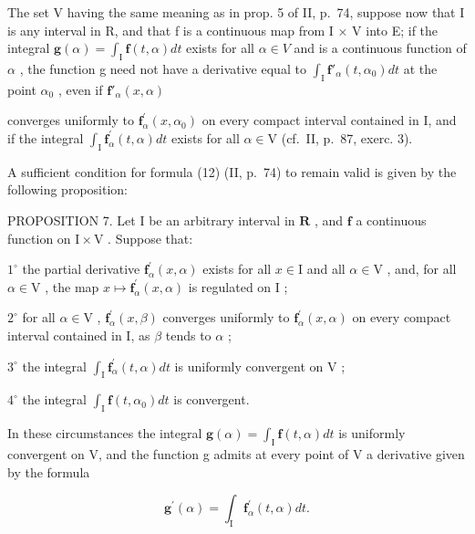 The set V having the same meaning as in prop. 5 of II, p.~74, suppose now that I is any interval in R, and that f is a continuous map from I × V into E; if the integral \(\mathbf{g}(\alpha) = \int_{\mathrm{I}} \mathbf{f}(t, \alpha) dt\) exists for all \(\alpha \in V\) and is a continuous function of \(\alpha\) , the function g need not have a derivative equal to \(\int_{\mathrm{I}} \mathbf{f}'_{\alpha}(t, \alpha_0) dt\) at the point \(\alpha_0\) , even if \(\mathbf{f}'_{\alpha}(x, \alpha)\)

converges uniformly to \(\mathbf{f}_{\alpha}^{\prime}(x,\alpha_{0})\) on every compact interval contained in I, and if the integral \(\int_{\mathrm{I}}\mathbf{f}_{\alpha}^{\prime}(t,\alpha)dt\) exists for all \(\alpha \in \mathrm{V}\) (cf.~II, p.~87, exerc. 3).

A sufficient condition for formula (12) (II, p.~74) to remain valid is given by the following proposition:

PROPOSITION 7. Let I be an arbitrary interval in \(\mathbf{R}\) , and \(\mathbf{f}\) a continuous function on \(\mathrm{I} \times \mathrm{V}\) . Suppose that:

\(1^{\circ}\) the partial derivative \(\mathbf{f}_{\alpha}^{\prime}(x,\alpha)\) exists for all \(x\in \mathrm{I}\) and all \(\alpha \in \mathrm{V}\) , and, for all \(\alpha \in \mathrm{V}\) , the map \(x\mapsto \mathbf{f}_{\alpha}^{\prime}(x,\alpha)\) is regulated on \(\mathrm{I}\) ;

\(2^{\circ}\) for all \(\alpha \in \mathrm{V}\) , \(\mathbf{f}_{\alpha}^{\prime}(x,\beta)\) converges uniformly to \(\mathbf{f}_{\alpha}^{\prime}(x,\alpha)\) on every compact interval contained in I, as \(\beta\) tends to \(\alpha\) ;

\(3^{\circ}\) the integral \(\int_{\mathrm{I}}\mathbf{f}_{\alpha}^{\prime}(t,\alpha)dt\) is uniformly convergent on \(\mathrm{V}\) ;

\(4^{\circ}\) the integral \(\int_{\mathrm{I}}\mathbf{f}(t,\alpha_0)dt\) is convergent.

In these circumstances the integral \(\mathbf{g}(\alpha)=\int_{\mathrm{I}}\mathbf{f}(t,\alpha)dt\) is uniformly convergent on V, and the function g admits at every point of V a derivative given by the formula

\[
\mathbf {g} ^ {\prime} (\alpha) = \int_ {\mathrm{I}} \mathbf {f} _ {\alpha} ^ {\prime} (t, \alpha) d t.\tag{14}
\]

